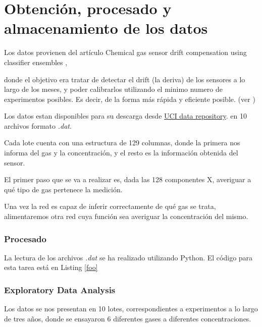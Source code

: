 \chapter{Obtención, procesado y almacenamiento de los datos}


Los datos provienen del artículo  Chemical gas sensor drift compensation using classifier ensembles \cite{GasData},

donde el objetivo era tratar de detectar el drift (la deriva) de los sensores a lo largo de los meses, y poder calibrarlos
utilizando el minimo numero de experimentos posibles. Es decir, de la forma más rápida y eficiente posible.
(ver \cite{GasData})

Los datos estan disponibles para su descarga desde
\href{https://archive.ics.uci.edu/ml//datasets/Gas+Sensor+Array+Drift+Dataset#}{UCI data repository}.
en 10 archivos formato \emph{.dat}.

Cada lote cuenta con una estructura de 129 columnas, donde la primera nos informa del gas y la concentración,
y el resto es la información obtenida del sensor.

El primer paso que se va a realizar es, dada las 128 componentes X,
averiguar a qué tipo de gas pertenece la medición.

Una vez la red es capaz de inferir correctamente de qué gas se trata,
alimentaremos otra red cuya función
sea averiguar la concentración del mismo.

\subsection{Procesado}

La lectura de los archivos  \emph{.dat} se ha realizado utilizando Python.
El código para esta tarea está en Listing \ref{foo}



\subsection{Exploratory Data Analysis}

Los datos se nos presentan en 10 lotes, correspondientes a experimentos a lo largo de tres años, donde se ensayaron
6 diferentes gases a diferentes concentraciones.

